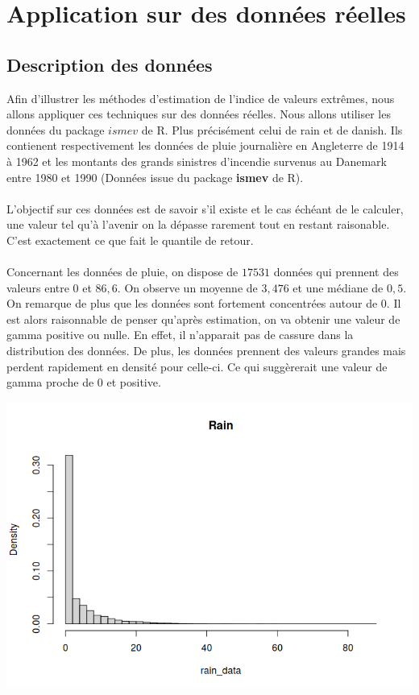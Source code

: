 \documentclass{article}
\theoremstyle{plain}
\theoremstyle{definition}
\theoremstyle{plain}
\begin{document}
\section{Application sur des données réelles}
\subsection{Description des données}

\noindent Afin d'illustrer les méthodes d'estimation de l'indice de valeurs extrêmes, nous allons appliquer ces techniques sur des données réelles.
Nous allons utiliser les données du package $ismev$ de R. Plus précisément celui de rain et de danish. Ils contienent respectivement les données de pluie journalière en Angleterre de 1914 à 1962 et 
les montants des grands sinistres d'incendie survenus au Danemark entre 1980 et 1990 (Données issue du package \textbf{ismev} de R).
\\
\\
L'objectif sur ces données est de savoir s'il existe et le cas échéant de le calculer, une valeur tel qu'à l'avenir on la dépasse rarement tout en restant raisonable. C'est exactement ce que fait le quantile de retour.
\\
\\
Concernant les données de pluie, on dispose de $17531$ données qui prennent des valeurs entre $0$ et $86,6$. On observe un moyenne de $3,476$ et une médiane de $0,5$.
\\
On remarque de plus que les données sont fortement concentrées autour de 0.
Il est alors raisonnable de penser qu'après estimation, on va obtenir une valeur de gamma positive ou nulle. En effet, il n'apparait pas de cassure dans la distribution des données.
De plus, les données prennent des valeurs grandes mais perdent rapidement en densité pour celle-ci. Ce qui suggèrerait une valeur de gamma proche de $0$ et positive.

\begin{center}
	\includegraphics[scale=0.62]{./images/rainhisto.png} 
\end{center}
\end{document}
